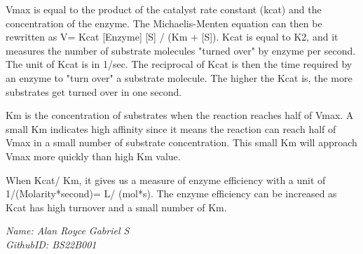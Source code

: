 Vmax is equal to the product of the catalyst rate constant (kcat) and the concentration of the enzyme. The Michaelis-Menten equation can then be rewritten as V= Kcat [Enzyme] [S] / (Km + [S]). Kcat is equal to K2, and it measures the number of substrate molecules "turned over" by enzyme per second. The unit of Kcat is in 1/sec. The reciprocal of Kcat is then the time required by an enzyme to "turn over" a substrate molecule. The higher the Kcat is, the more substrates get turned over in one second.

Km is the concentration of substrates when the reaction reaches half of Vmax. A small Km indicates high affinity since it means the reaction can reach half of Vmax in a small number of substrate concentration. This small Km will approach Vmax more quickly than high Km value.

When Kcat/ Km, it gives us a measure of enzyme efficiency with a unit of 1/(Molarity*second)= L/ (mol*s). The enzyme efficiency can be increased as Kcat has high turnover and a small number of Km. 



\emph{Name: Alan Royce Gabriel S} \\
\emph{GithubID: BS22B001} \\
